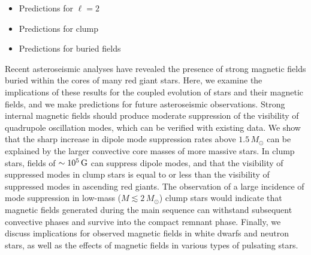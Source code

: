 \begin{itemize}
\item Predictions for $\ell = 2$
\item Predictions for clump 
\item Predictions for buried fields
\end{itemize}



Recent asteroseismic analyses have revealed the presence of strong magnetic fields buried within the cores of many red giant stars. Here, we examine the implications of these results for the coupled evolution of stars and their magnetic fields, and we make predictions for future asteroseismic observations. Strong internal magnetic fields should produce moderate suppression of the visibility of quadrupole oscillation modes, which can be verified with existing data. We show that the sharp increase in dipole mode suppression rates above $1.5 \, M_\odot$ can be explained by the larger convective core masses of more massive stars. 
In clump stars, fields of $\sim 10^5 \, {\rm G}$ can suppress dipole modes, and that the visibility of suppressed modes in clump stars is equal to or less than the visibility of suppressed modes in ascending red giants. The observation of a large incidence of mode suppression in low-mass ($M \lesssim 2 \, M_\odot$) clump stars would indicate that magnetic fields generated during the main sequence can withstand subsequent convective phases and survive into the compact remnant phase. Finally, we discuss implications for observed magnetic fields in white dwarfs and neutron stars, as well as the effects of magnetic fields in various types of pulsating stars.
  